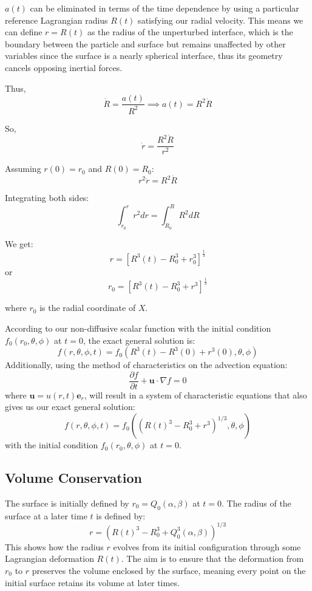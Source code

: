 \documentclass{article}
\begin{document}
\(a(t)\) can be eliminated in terms of the time dependence by using a particular reference Lagrangian radius \(R(t)\) satisfying our radial velocity. This means we can define \(r = R(t)\) as the radius of the unperturbed interface, which is the boundary between the particle and surface but remains unaffected by other variables since the surface is a nearly spherical interface, thus its geometry cancels opposing inertial forces.

Thus, 
\[\dot{R} = \frac{a(t)}{R^2} \implies a(t) = R^2 \dot{R}\]

So,
\[\dot{r} = \frac{R^2 \dot{R}}{r^2}\]

Assuming \(r(0) = r_0\) and \(R(0) = R_0\):
\[r^2 \dot{r} = R^2 \dot{R}\]

Integrating both sides:
\[\int_{r_0}^{r} r^2 dr = \int_{R_0}^{R} R^2 dR\]

We get:
\[ r = \left[ R^3(t) - R_0^3 + r_0^3 \right]^{\frac{1}{3}} \]
or
\[ r_0 = \left[ R^3(t) - R_0^3 + r^3 \right]^{\frac{1}{3}} \]

where \(r_0\) is the radial coordinate of \(X\).

According to our non-diffusive scalar function with the initial condition \(f_0(r_0, \theta, \phi)\) at \(t = 0\), the exact general solution is:
\begin{equation}
f(r, \theta, \phi, t) = f_0(R^3(t) - R^3(0) + r^3(0), \theta, \phi)
\end{equation}
Additionally, using the method of characteristics on the advection equation:
\begin{equation}
\frac{\partial f}{\partial t} + \mathbf{u} \cdot \nabla f = 0
\end{equation}
where \( \mathbf{u} = u(r, t) \mathbf{e}_r \), will result in a system of characteristic equations that also gives us our exact general solution:
\begin{equation}
f(r, \theta, \phi, t) = f_0 \left( \left( R(t)^3 - R_0^3 + r^3 \right)^{1/3}, \theta, \phi \right)
\end{equation}
with the initial condition \( f_0(r_0, \theta, \phi) \) at \( t = 0 \).

\subsection{Volume Conservation}
The surface is initially defined by \(r_0 = Q_0(\alpha, \beta)\) at \(t = 0\). The radius of the surface at a later time \(t\) is defined by:
\[
r = \left( R(t)^3 - R_0^3 + Q_0^3(\alpha, \beta) \right)^{1/3}
\]
This shows how the radius \(r\) evolves from its initial configuration through some Lagrangian deformation \(R(t)\). The aim is to ensure that the deformation from \(r_0\) to \(r\) preserves the volume enclosed by the surface, meaning every point on the initial surface retains its volume at later times.
\end{document}
